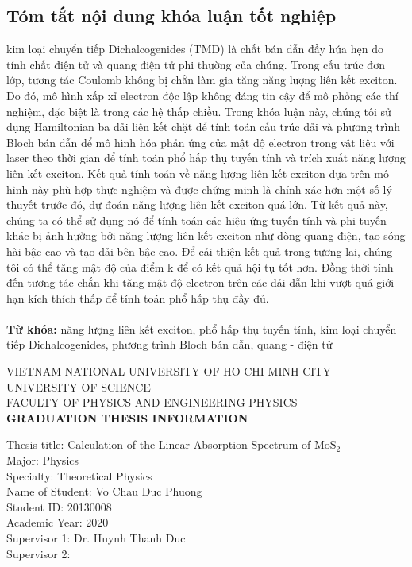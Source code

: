\documentclass[12pt,english,a4paper]{article}
\begin{document}
	\subsection*{Tóm tắt nội dung khóa luận tốt nghiệp}
	\quad kim loại chuyển tiếp Dichalcogenides (TMD) là chất bán dẫn đầy hứa hẹn do tính chất điện tử và quang điện tử phi thường của chúng. Trong cấu trúc đơn lớp, tương tác Coulomb không bị chắn làm gia tăng năng lượng liên kết exciton. Do đó, mô hình xấp xỉ electron độc lập không đáng tin cậy để mô phỏng các thí nghiệm, đặc biệt là trong các hệ thấp chiều. Trong khóa luận này, chúng tôi sử dụng Hamiltonian ba dải liên kết chặt để tính toán cấu trúc dải và phương trình Bloch bán dẫn để mô hình hóa phản ứng của mật độ electron trong vật liệu với laser theo thời gian để tính toán phổ hấp thụ tuyến tính và trích xuất năng lượng liên kết exciton. Kết quả tính toán về năng lượng liên kết exciton dựa trên mô hình này phù hợp thực nghiệm và được chứng minh là chính xác hơn một số lý thuyết trước đó, dự đoán năng lượng liên kết exciton quá lớn. Từ kết quả này, chúng ta có thể sử dụng nó để tính toán các hiệu ứng tuyến tính và phi tuyến khác bị ảnh hưởng bởi năng lượng liên kết exciton như dòng quang điện, tạo sóng hài bậc cao và tạo dải bên bậc cao. Để cải thiện kết quả trong tương lai, chúng tôi có thể tăng mật độ của điểm k để có kết quả hội tụ tốt hơn. Đồng thời tính đến tương tác chắn khi tăng mật độ electron trên các dải dẫn khi vượt quá giới hạn kích thích thấp để tính toán phổ hấp thụ đầy đủ.\\\null
	\\[1cm]
	\textbf{Từ khóa:} năng lượng liên kết exciton, phổ hấp thụ tuyến tính, kim loại chuyển tiếp Dichalcogenides, phương trình Bloch bán dẫn, quang - điện tử
	\newpage
	\begin{center}
		{\large {VIETNAM NATIONAL UNIVERSITY OF HO CHI MINH CITY}\\ {UNIVERSITY OF SCIENCE}\\
		{ {FACULTY OF PHYSICS AND ENGINEERING PHYSICS}}}\\[1cm]
		{\textbf{GRADUATION THESIS INFORMATION}}
	\end{center}
	\quad Thesis title: Calculation of the Linear-Absorption Spectrum of $\mathrm{MoS}_2$\\\null
	\quad Major: Physics\\\null
	\quad Specialty: Theoretical Physics\\\null
	\quad Name of Student: Vo Chau Duc Phuong\\\null
	\quad Student ID: 20130008\\\null
	\quad Academic Year: 2020\\\null
	\quad Supervisor 1: Dr. Huynh Thanh Duc \\\null
	\quad Supervisor 2:\\\null
\end{document}
